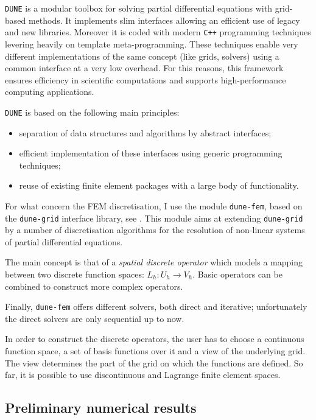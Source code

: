 \documentclass[a4paper,11pt, onecolumn]{article}
\newcommand{\cor}[1]{\textit{#1}} %
\begin{document}
\noindent \verb|DUNE| is a modular toolbox for solving partial differential equations with grid-based methods. It implements slim interfaces allowing an efficient use of legacy and new libraries. Moreover it is coded with modern \verb|C++| programming techniques levering heavily on template meta-programming. These techniques enable very different implementations of the same concept (like grids, solvers) using a common interface at a very low overhead. For this reasons, this framework ensures efficiency in scientific computations and supports high-performance computing applications.

\noindent \verb|DUNE| is based on the following main principles:
\begin{itemize}
 \item separation of data structures and algorithms by abstract interfaces;
 \item efficient implementation of these interfaces using generic programming techniques;
 \item reuse of existing finite element packages with a large body of functionality.
\end{itemize}

\noindent For what concern the FEM discretisation, I use the module \verb|dune-fem|, based on the \verb|dune-grid| interface library, see \cite{dunefempaper10}. This module aims at extending \verb|dune-grid| by a number of discretisation algorithms for the resolution of non-linear systems of partial differential equations.

\noindent The main concept is that of a \cor{spatial discrete operator} which models a mapping between two discrete function spaces: $L_h : U_h \to V_h$. Basic operators can be combined to construct more complex operators.

\noindent Finally, \verb|dune-fem| offers different solvers, both direct and iterative; unfortunately the direct solvers are only sequential up to now. 
\newline

\noindent In order to construct the discrete operators, the user has to choose a continuous function space, a set of basis functions over it and a view of the underlying grid. The view determines the part of the grid on which the functions are defined. So far, it is possible to use discontinuous and Lagrange finite element spaces.

\subsection{Preliminary numerical results}
\end{document}
